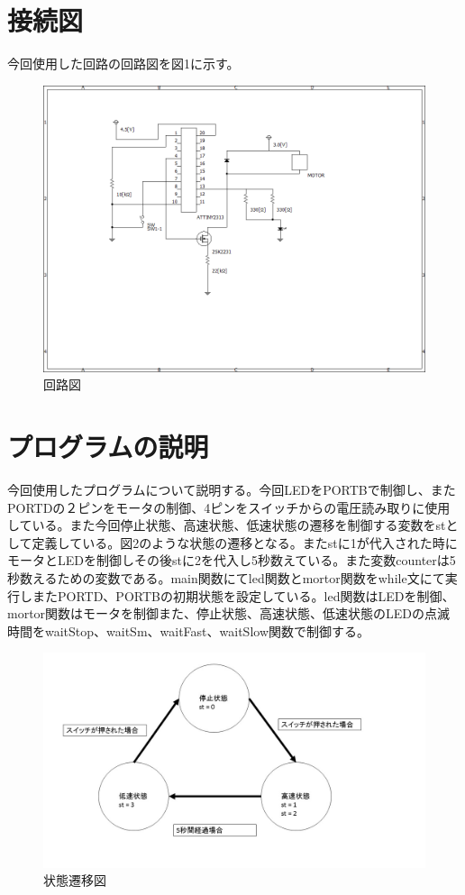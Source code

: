 \documentclass{jsarticle}
\begin{document}
\newpage
\section{接続図}
今回使用した回路の回路図を図1に示す。
\begin{figure}[htbp]
 \begin{center}
  \includegraphics[width=15cm]{回路図.png}
 \end{center}
 \caption{回路図}
\end{figure}


\section{プログラムの説明}
今回使用したプログラムについて説明する。今回LEDをPORTBで制御し、またPORTDの２ピンをモータの制御、4ピンをスイッチからの電圧読み取りに使用している。また今回停止状態、高速状態、低速状態の遷移を制御する変数をstとして定義している。図2のような状態の遷移となる。またstに1が代入された時にモータとLEDを制御しその後stに2を代入し5秒数えている。また変数counterは5秒数えるための変数である。main関数にてled関数とmortor関数をwhile文にて実行しまたPORTD、PORTBの初期状態を設定している。led関数はLEDを制御、mortor関数はモータを制御また、停止状態、高速状態、低速状態のLEDの点滅時間をwaitStop、waitSm、waitFast、waitSlow関数で制御する。


\begin{figure}[htbp]
 \begin{center}
  \includegraphics[width=15cm]{状態遷移図.jpg}
 \end{center}
 \caption{状態遷移図}
\end{figure}
\end{document}
